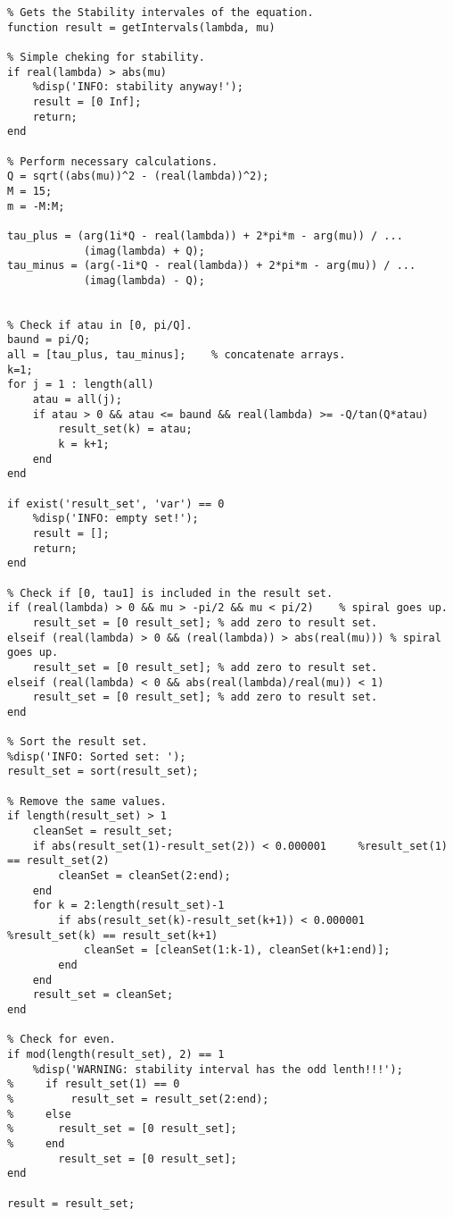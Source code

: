 \begin{verbatim}
% Gets the Stability intervales of the equation.
function result = getIntervals(lambda, mu)

% Simple cheking for stability.
if real(lambda) > abs(mu)
	%disp('INFO: stability anyway!');
	result = [0 Inf];
	return;
end

% Perform necessary calculations.
Q = sqrt((abs(mu))^2 - (real(lambda))^2);
M = 15;
m = -M:M;

tau_plus = (arg(1i*Q - real(lambda)) + 2*pi*m - arg(mu)) / ...
			(imag(lambda) + Q);
tau_minus = (arg(-1i*Q - real(lambda)) + 2*pi*m - arg(mu)) / ...
			(imag(lambda) - Q);


% Check if atau in [0, pi/Q].
baund = pi/Q;
all = [tau_plus, tau_minus];	% concatenate arrays.
k=1;
for j = 1 : length(all) 
	atau = all(j); 
	if atau > 0 && atau <= baund && real(lambda) >= -Q/tan(Q*atau)
		result_set(k) = atau;
		k = k+1;
	end
end

if exist('result_set', 'var') == 0
	%disp('INFO: empty set!');
	result = [];
	return;
end

% Check if [0, tau1] is included in the result set.
if (real(lambda) > 0 && mu > -pi/2 && mu < pi/2)	% spiral goes up.
	result_set = [0 result_set]; % add zero to result set.
elseif (real(lambda) > 0 && (real(lambda)) > abs(real(mu)))	% spiral goes up.
	result_set = [0 result_set]; % add zero to result set.
elseif (real(lambda) < 0 && abs(real(lambda)/real(mu)) < 1)
	result_set = [0 result_set]; % add zero to result set.		
end

% Sort the result set.
%disp('INFO: Sorted set: ');
result_set = sort(result_set);

% Remove the same values.
if length(result_set) > 1
    cleanSet = result_set;
    if abs(result_set(1)-result_set(2)) < 0.000001     %result_set(1) == result_set(2)
        cleanSet = cleanSet(2:end);
    end
    for k = 2:length(result_set)-1
        if abs(result_set(k)-result_set(k+1)) < 0.000001 %result_set(k) == result_set(k+1)
            cleanSet = [cleanSet(1:k-1), cleanSet(k+1:end)];
        end
    end
    result_set = cleanSet;
end

% Check for even.
if mod(length(result_set), 2) == 1
    %disp('WARNING: stability interval has the odd lenth!!!');
%     if result_set(1) == 0
%         result_set = result_set(2:end);
%     else
%     	result_set = [0 result_set];
%     end
    	result_set = [0 result_set];
end

result = result_set;

\end{verbatim}

